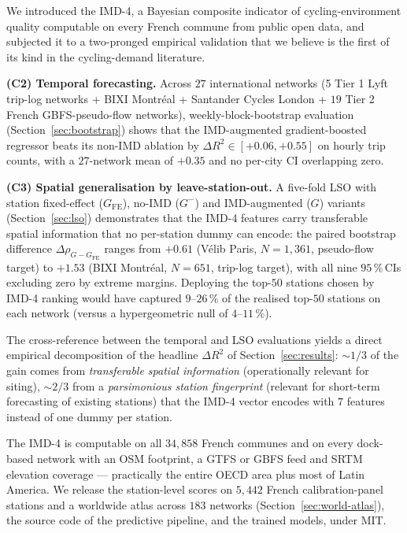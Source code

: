 \documentclass[11pt,a4paper]{article}
\begin{document}
We introduced the IMD-4, a Bayesian composite indicator of
cycling-environment quality computable on every French commune
from public open data, and subjected it to a two-pronged
empirical validation that we believe is the first of its kind in
the cycling-demand literature.

\textbf{(C2) Temporal forecasting.}  Across $27$ international
networks (5 Tier 1 Lyft trip-log networks + BIXI Montr\'eal +
Santander Cycles London + $19$ Tier 2 French GBFS-pseudo-flow
networks), weekly-block-bootstrap evaluation
(Section~\ref{sec:bootstrap}) shows that the IMD-augmented
gradient-boosted regressor beats its non-IMD ablation by
$\Delta R^2 \in [+0.06, +0.55]$ on hourly trip counts, with a
$27$-network mean of $+0.35$ and no per-city CI overlapping zero.

\textbf{(C3) Spatial generalisation by leave-station-out.}
A five-fold LSO with station fixed-effect ($G_{\mathrm{FE}}$),
no-IMD ($G^-$) and IMD-augmented ($G$) variants
(Section~\ref{sec:lso}) demonstrates that the IMD-4 features
carry transferable spatial information that no per-station dummy
can encode: the paired bootstrap difference
$\Delta\rho_{G - G_{\mathrm{FE}}}$ ranges from $+0.61$
(V\'elib Paris, $N = 1{,}361$, pseudo-flow target) to $+1.53$
(BIXI Montr\'eal, $N = 651$, trip-log target), with all nine
$95\,\%$\,CIs excluding zero by extreme margins.  Deploying the
top-$50$ stations chosen by IMD-4 ranking would have captured
$9$--$26\,\%$ of the realised top-$50$ stations on each network
(versus a hypergeometric null of $4$--$11\,\%$).

The cross-reference between the temporal and LSO evaluations
yields a direct empirical decomposition of the headline
$\Delta R^2$ of Section~\ref{sec:results}: $\sim 1/3$ of the gain
comes from \emph{transferable spatial information} (operationally
relevant for siting), $\sim 2/3$ from a \emph{parsimonious
station fingerprint} (relevant for short-term forecasting of
existing stations) that the IMD-4 vector encodes with $7$ features
instead of one dummy per station.

The IMD-4 is computable on all $34{,}858$ French communes and
on every dock-based network with an OSM footprint, a GTFS or
GBFS feed and SRTM elevation coverage — practically the entire
OECD area plus most of Latin America.  We release the
station-level scores on $5{,}442$ French calibration-panel stations
and a worldwide atlas across $183$ networks
(Section~\ref{sec:world-atlas}), the source code of the
predictive pipeline, and the trained models, under MIT.
\end{document}
